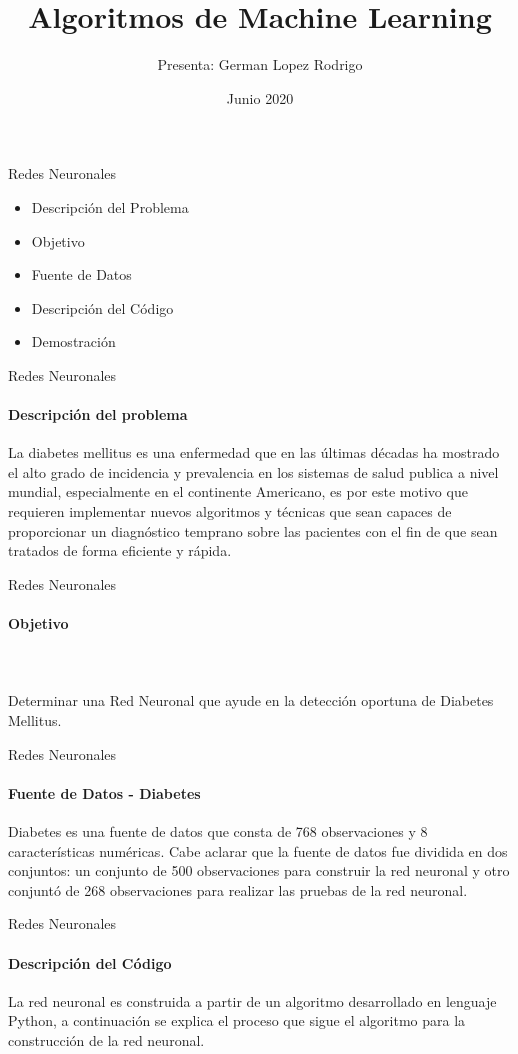 \documentclass{beamer}
\title{Algoritmos de  Machine Learning}
\author{Presenta: German Lopez Rodrigo}
\date{Junio 2020}
\begin{document}
\maketitle
\begin{frame}{Redes Neuronales}
\begin{itemize}
\item Descripción del Problema
\item Objetivo
\item Fuente de Datos
\item Descripción del Código
\item Demostración
\end{itemize}
\end{frame}

\begin{frame}{Redes Neuronales}
\framesubtitle{Descripción del problema}
La diabetes mellitus es una enfermedad que en las últimas décadas ha mostrado el alto grado de incidencia y prevalencia en los sistemas de salud publica a nivel mundial, especialmente en el continente Americano, es por este motivo que requieren implementar nuevos algoritmos y técnicas que sean capaces de proporcionar un diagnóstico temprano sobre las pacientes con el fin de que sean tratados de forma eficiente y rápida.\\
\end{frame}

\begin{frame}{Redes Neuronales}
\framesubtitle{Objetivo}
\\ \\ Determinar una Red Neuronal que ayude en la detección oportuna de Diabetes Mellitus.\\
\end{frame}

\begin{frame}{Redes Neuronales}
\framesubtitle{Fuente de Datos - Diabetes}
Diabetes es una fuente de datos que consta de 768 observaciones y 8 características numéricas. Cabe aclarar que la fuente de datos fue dividida en dos conjuntos: un conjunto de 500 observaciones para construir la red neuronal y otro conjuntó de 268 observaciones para realizar las pruebas de la red neuronal.\\
\end{frame}

\begin{frame}{Redes Neuronales}
\framesubtitle{Descripción del Código}
La red neuronal es construida a partir de un algoritmo desarrollado en lenguaje Python, a continuación se explica el proceso que sigue el algoritmo para la construcción de la red neuronal.\\
\end{frame}
\end{document}
